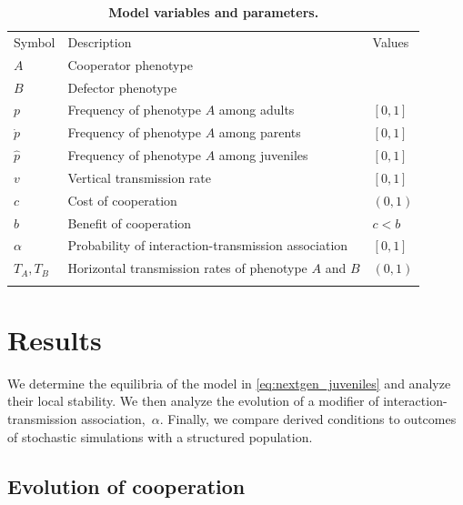 \documentclass[12pt]{extarticle}
\begin{document}
\begin{table}[p]
\centering
\caption{\textbf{Model variables and parameters.}
}
\begin{tabular}{lll}
\toprule
Symbol & Description & Values \\ \cmidrule(r){1-3}
$A$ & Cooperator phenotype & \\
$B$ & Defector phenotype & \\
$p$ & Frequency of phenotype $A$ among adults & $[0,1]$ \\
$\dot p$ & Frequency of phenotype $A$ among parents & $[0,1]$ \\
$\hat p$ & Frequency of phenotype $A$ among juveniles & $[0,1]$ \\
$v$ & Vertical transmission rate & $[0,1]$ \\
$c$ & Cost of cooperation & $(0,1)$ \\
$b$ & Benefit of cooperation & $c<b$ \\
$\alpha$ & Probability of interaction-transmission association & $[0,1]$ \\
$T_A, T_B$ & Horizontal transmission rates of phenotype $A$ and $B$ & $(0,1)$ \\
\\ \bottomrule
\end{tabular}
\label{table:vars_params}
\end{table}

\newpage
\newpage
\section{Results}

We determine the equilibria of the model in \autoref{eq:nextgen_juveniles}
and analyze their local stability.
We then analyze the evolution of a modifier of interaction-transmission association,~$\alpha$.
Finally, we compare derived conditions to outcomes of stochastic simulations with a structured population.

\subsection{Evolution of cooperation}
\end{document}
